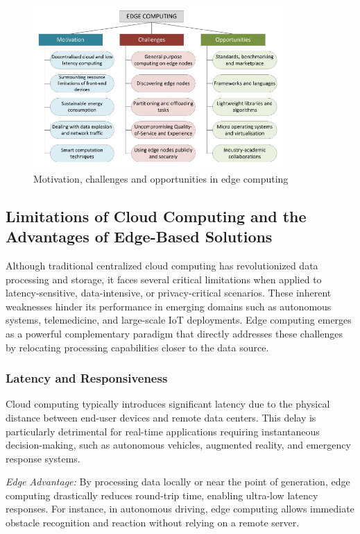 \documentclass[runningheads]{llncs}
\begin{document}
\begin{figure}[h!]
    \centering
    \includegraphics[width=0.85\textwidth]{IMG/10.png}
    \caption{Motivation, challenges and opportunities in edge computing}
    \label{fig:motivation_challenges_opportunities}
    \end{figure}
\FloatBarrier

\subsection{Limitations of Cloud Computing and the Advantages of Edge-Based Solutions}

Although traditional centralized cloud computing has revolutionized data processing and storage, it faces several critical limitations when applied to latency-sensitive, data-intensive, or privacy-critical scenarios. These inherent weaknesses hinder its performance in emerging domains such as autonomous systems, telemedicine, and large-scale IoT deployments. Edge computing emerges as a powerful complementary paradigm that directly addresses these challenges by relocating processing capabilities closer to the data source.

\subsubsection{Latency and Responsiveness}
Cloud computing typically introduces significant latency due to the physical distance between end-user devices and remote data centers. This delay is particularly detrimental for real-time applications requiring instantaneous decision-making, such as autonomous vehicles, augmented reality, and emergency response systems.

\noindent\textit{Edge Advantage:} By processing data locally or near the point of generation, edge computing drastically reduces round-trip time, enabling ultra-low latency responses. For instance, in autonomous driving, edge computing allows immediate obstacle recognition and reaction without relying on a remote server.
\end{document}
